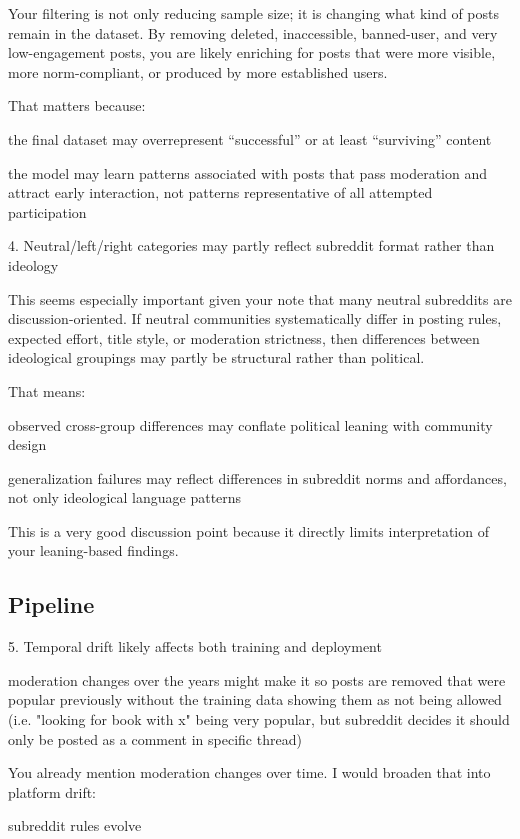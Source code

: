 Your filtering is not only reducing sample size; it is changing what kind of posts remain in the dataset. By removing deleted, inaccessible, banned-user, and very low-engagement posts, you are likely enriching for posts that were more visible, more norm-compliant, or produced by more established users.

That matters because:

the final dataset may overrepresent “successful” or at least “surviving” content

the model may learn patterns associated with posts that pass moderation and attract early interaction, not patterns representative of all attempted participation

4. Neutral/left/right categories may partly reflect subreddit format rather than ideology

This seems especially important given your note that many neutral subreddits are discussion-oriented. If neutral communities systematically differ in posting rules, expected effort, title style, or moderation strictness, then differences between ideological groupings may partly be structural rather than political.

That means:

observed cross-group differences may conflate political leaning with community design

generalization failures may reflect differences in subreddit norms and affordances, not only ideological language patterns

This is a very good discussion point because it directly limits interpretation of your leaning-based findings.




\subsection{Pipeline}

5. Temporal drift likely affects both training and deployment

moderation changes over the years might make it so posts are removed that were popular previously without the training data showing them as not being allowed (i.e. "looking for book with x" being very popular, but subreddit decides it should only be posted as a comment in specific thread)

You already mention moderation changes over time. I would broaden that into platform drift:

subreddit rules evolve

